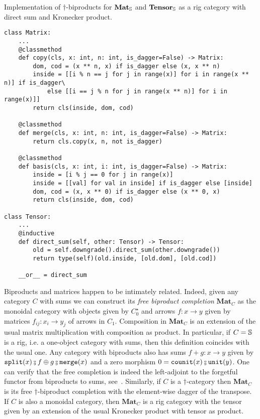 \begin{python}
{\normalfont Implementation of $\dagger$-biproducts for $\mathbf{Mat}_\S$
and $\mathbf{Tensor}_\S$ as a rig category with direct sum and Kronecker product.}

\begin{verbatim}
class Matrix:
    ...
    @classmethod
    def copy(cls, x: int, n: int, is_dagger=False) -> Matrix:
        dom, cod = (x ** n, x) if is_dagger else (x, x ** n)
        inside = [[i % n == j for j in range(x)] for i in range(x ** n)] if is_dagger\
            else [[i == j % n for j in range(x ** n)] for i in range(x)]]
        return cls(inside, dom, cod)

    @classmethod
    def merge(cls, x: int, n: int, is_dagger=False) -> Matrix:
        return cls.copy(x, n, not is_dagger)

    @classmethod
    def basis(cls, x: int, i: int, is_dagger=False) -> Matrix:
        inside = [i % j == 0 for j in range(x)]
        inside = [[val] for val in inside] if is_dagger else [inside]
        dom, cod = (x, x ** 0) if is_dagger else (x ** 0, x)
        return cls(inside, dom, cod)

class Tensor:
    ...
    @inductive
    def direct_sum(self, other: Tensor) -> Tensor:
        old = self.downgrade().direct_sum(other.downgrade())
        return type(self)(old.inside, [old.dom], [old.cod])

    __or__ = direct_sum
\end{verbatim}
\end{python}

Biproducts and matrices happen to be intimately related.
Indeed, given any category $C$ with sums we can construct its \emph{free biproduct completion} $\mathbf{Mat}_C$ as the monoidal category with objects given by $C_0^\star$ and arrows $f : x \to y$ given by matrices $f_{ij} : x_i \to y_j$ of arrows in $C_1$.
Composition in $\mathbf{Mat}_C$ is an extension of the usual matrix multiplication with composition as product.
In particular, if $C = \S$ is a rig, i.e. a one-object category with sums, then this definition coincides with the usual one.
Any category with biproducts also has sums $f + g : x \to y$ given by $\ttsplit(x) \fcmp f \oplus g \fcmp \merge(x)$ and a zero morphism $0 = \counit(x) \fcmp \unit(y)$.
One can verify that the free completion is indeed the left-adjoint to the forgetful functor from biproducts to sums, see~\cite[Exercise VIII.2.6]{MacLane71}.
Similarly, if $C$ is a $\dagger$-category then $\mathbf{Mat}_C$ is its free $\dagger$-biproduct completion with the element-wise dagger of the transpose.
If $C$ is also a monoidal category, then $\mathbf{Mat}_C$ is a rig category with the tensor given by an extension of the usual Kronecker product with tensor as product.

